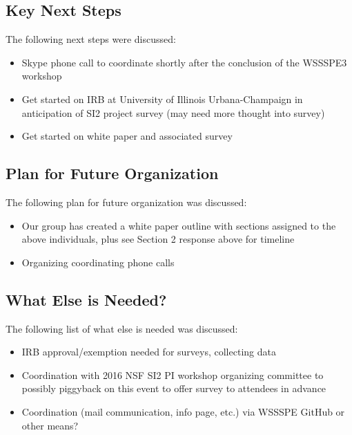 \subsection{Key Next Steps}

The following next steps were discussed:

\begin{itemize}
\item
Skype phone call to coordinate shortly after the conclusion of the WSSSPE3 workshop

\item
Get started on IRB at University of Illinois Urbana-Champaign in anticipation of
SI2 project survey (may need more thought into survey)

\item
Get started on white paper and associated survey

\end{itemize}



\subsection{Plan for Future Organization}

The following plan for future organization was discussed:

\begin{itemize}
\item
Our group has created a white paper outline with sections assigned to the above
individuals, plus see Section 2 response above for timeline

\item
Organizing coordinating phone calls

\end{itemize}




\subsection{What Else is Needed?}

The following list of what else is needed was discussed:

\begin{itemize}
\item
IRB approval/exemption needed for surveys, collecting data

\item
Coordination with 2016 NSF SI2 PI workshop organizing committee to possibly
piggyback on this event to offer survey to attendees in advance

\item
Coordination (mail communication, info page, etc.) via WSSSPE GitHub or other
means?

\end{itemize}



